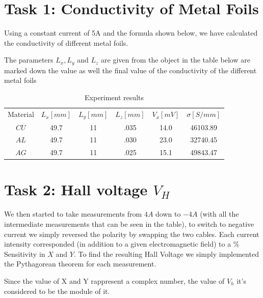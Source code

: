 \documentclass{article}
\begin{document}
\newpage

\section{Task 1: Conductivity of Metal Foils}
Using a constant current of 5A and the formula shown below, we have calculated the conductivity of different metal foils. 

\noindent The parameters $L_{x}, L_{y}$ and $L_{z}$ are given from the object in the table below are marked down the value as well the final value of the conductivity of the different metal foils

\begin{table}[h]
	\caption{Experiment results}
	\vspace{0.1cm}
	\centering
	\begin{tabular}{c c c c c c}
		\hline\hline
		Material & $L_{x} [mm]$ & $L_{y}[mm]$ & $L_{z}[mm]$ & $V_{x}[mV]$ & $\sigma[S/mm]$ \\ [1ex]
		$CU$ & 49.7 & 11 & .035 & 14.0 & 46103.89 \\
		$AL$ & 49.7 & 11 & .030 & 23.0 & 32740.45 \\
		$AG$ & 49.7 & 11 & .025 & 15.1 & 49843.47 \\ [1ex]
		\hline\hline
	\end{tabular} 
	\vspace{0.4cm}
\end{table}

\newpage

\section{Task 2: Hall voltage $V_{H}$}

We then started to take measurements from $4A$ down to $-4A$ (with all the intermediate measurements that can be seen in the table), to switch to negative current we simply reversed the polarity by swapping the two cables.
Each current intensity corresponded (in addition to a given electromagnetic field) to a \% Sensitivity in $X$ and $Y$.
To find the resulting Hall Voltage we simply implemented the Pythagorean theorem for each measurement.


\noindent Since the value of X and Y rappresent a complex number, the value of $V_{h}$ it's considered to be the module of it.
\end{document}
